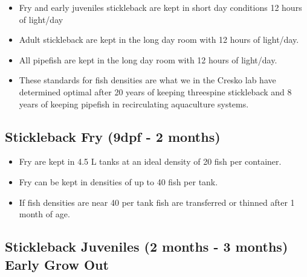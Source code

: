 \documentclass[
  letterpaper,
  DIV=11,
  numbers=noendperiod]{scrreprt}
\providecommand{\tightlist}{%
  \setlength{\itemsep}{0pt}\setlength{\parskip}{0pt}}\usepackage{longtable,booktabs,array}
\begin{document}
\begin{tcolorbox}[enhanced jigsaw, bottomtitle=1mm, rightrule=.15mm, toptitle=1mm, opacitybacktitle=0.6, bottomrule=.15mm, titlerule=0mm, coltitle=black, leftrule=.75mm, arc=.35mm, colback=white, colframe=quarto-callout-note-color-frame, left=2mm, colbacktitle=quarto-callout-note-color!10!white, title=\textcolor{quarto-callout-note-color}{\faInfo}\hspace{0.5em}{NOTES}, toprule=.15mm, opacityback=0, breakable]

\begin{itemize}
\tightlist
\item
  Fry and early juveniles stickleback are kept in short day conditions
  12 hours of light/day
\item
  Adult stickleback are kept in the long day room with 12 hours of
  light/day.
\item
  All pipefish are kept in the long day room with 12 hours of light/day.
\item
  These standards for fish densities are what we in the Cresko lab have
  determined optimal after 20 years of keeping threespine stickleback
  and 8 years of keeping pipefish in recirculating aquaculture systems.
\end{itemize}

\end{tcolorbox}

\hypertarget{stickleback-fry-9dpf---2-months}{%
\subsection{Stickleback Fry (9dpf - 2
months)}\label{stickleback-fry-9dpf---2-months}}

\begin{itemize}
\tightlist
\item
  Fry are kept in 4.5 L tanks at an ideal density of 20 fish per
  container.
\item
  Fry can be kept in densities of up to 40 fish per tank.
\item
  If fish densities are near 40 per tank fish are transferred or thinned
  after 1 month of age.
\end{itemize}

\hypertarget{stickleback-juveniles-2-months---3-months-early-grow-out}{%
\subsection{Stickleback Juveniles (2 months - 3 months) Early Grow
Out}\label{stickleback-juveniles-2-months---3-months-early-grow-out}}
\end{document}
